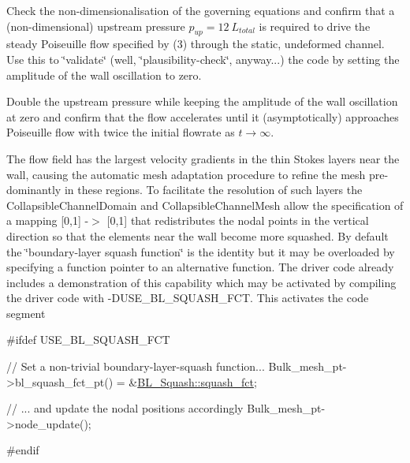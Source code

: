 \begin{DoxyEnumerate}
\item Check the non-\/dimensionalisation of the governing equations and confirm that a (non-\/dimensional) upstream pressure $ p_{up} = 12 \ L_{total} $ is required to drive the steady Poiseuille flow specified by (3) through the static, undeformed channel. Use this to \char`\"{}validate\char`\"{} (well, \char`\"{}plausibility-\/check\char`\"{}, anyway...) the code by setting the amplitude of the wall oscillation to zero.
\item Double the upstream pressure while keeping the amplitude of the wall oscillation at zero and confirm that the flow accelerates until it (asymptotically) approaches Poiseuille flow with twice the initial flowrate as $ t \to \infty. $
\item The flow field has the largest velocity gradients in the thin Stokes layers near the wall, causing the automatic mesh adaptation procedure to refine the mesh pre-\/dominantly in these regions. To facilitate the resolution of such layers the {\ttfamily Collapsible\+Channel\+Domain} and {\ttfamily Collapsible\+Channel\+Mesh} allow the specification of a mapping \mbox{[}0,1\mbox{]} -\/$>$ \mbox{[}0,1\mbox{]} that redistributes the nodal points in the vertical direction so that the elements near the wall become more squashed. By default the \char`\"{}boundary-\/layer squash function\char`\"{} is the identity but it may be overloaded by specifying a function pointer to an alternative function. The driver code already includes a demonstration of this capability which may be activated by compiling the driver code with {\ttfamily -\/\+D\+U\+S\+E\+\_\+\+B\+L\+\_\+\+S\+Q\+U\+A\+S\+H\+\_\+\+F\+CT}. This activates the code segment  
\begin{DoxyCodeInclude}
\textcolor{preprocessor}{#ifdef USE\_BL\_SQUASH\_FCT}

 \textcolor{comment}{// Set a non-trivial boundary-layer-squash function...}
 Bulk\_mesh\_pt->bl\_squash\_fct\_pt() = &\hyperlink{namespaceBL__Squash_a0fdaf7661591150041b7102dbe578cdc}{BL\_Squash::squash\_fct}; 

 \textcolor{comment}{// ... and update the nodal positions accordingly}
 Bulk\_mesh\_pt->node\_update();

\textcolor{preprocessor}{#endif}


\end{DoxyCodeInclude}
\end{DoxyEnumerate}
